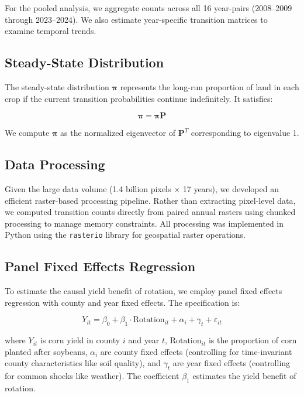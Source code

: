 \documentclass[12pt, a4paper]{article}
\begin{document}
For the pooled analysis, we aggregate counts across all 16 year-pairs (2008--2009 through 2023--2024). We also estimate year-specific transition matrices to examine temporal trends.

\subsection{Steady-State Distribution}

The steady-state distribution $\boldsymbol{\pi}$ represents the long-run proportion of land in each crop if the current transition probabilities continue indefinitely. It satisfies:

\begin{equation}
\boldsymbol{\pi} = \boldsymbol{\pi} \mathbf{P}
\end{equation}

We compute $\boldsymbol{\pi}$ as the normalized eigenvector of $\mathbf{P}^T$ corresponding to eigenvalue 1.

\subsection{Data Processing}

Given the large data volume (1.4 billion pixels $\times$ 17 years), we developed an efficient raster-based processing pipeline. Rather than extracting pixel-level data, we computed transition counts directly from paired annual rasters using chunked processing to manage memory constraints. All processing was implemented in Python using the \texttt{rasterio} library for geospatial raster operations.

\subsection{Panel Fixed Effects Regression}

To estimate the causal yield benefit of rotation, we employ panel fixed effects regression with county and year fixed effects. The specification is:

\begin{equation}
Y_{it} = \beta_0 + \beta_1 \cdot \text{Rotation}_{it} + \alpha_i + \gamma_t + \varepsilon_{it}
\end{equation}

where $Y_{it}$ is corn yield in county $i$ and year $t$, $\text{Rotation}_{it}$ is the proportion of corn planted after soybeans, $\alpha_i$ are county fixed effects (controlling for time-invariant county characteristics like soil quality), and $\gamma_t$ are year fixed effects (controlling for common shocks like weather). The coefficient $\beta_1$ estimates the yield benefit of rotation.
\end{document}
